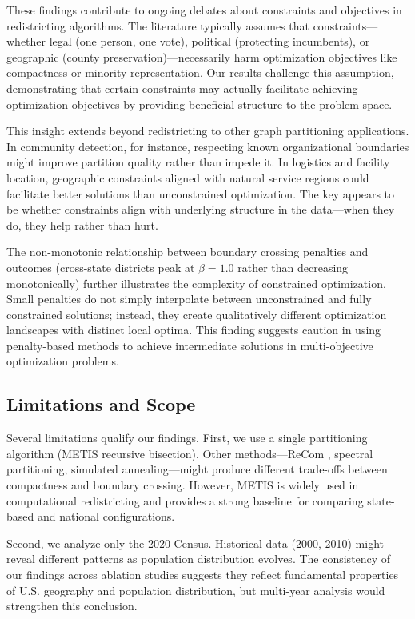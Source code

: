 These findings contribute to ongoing debates about constraints and objectives in redistricting algorithms. The literature typically assumes that constraints---whether legal (one person, one vote), political (protecting incumbents), or geographic (county preservation)---necessarily harm optimization objectives like compactness or minority representation. Our results challenge this assumption, demonstrating that certain constraints may actually facilitate achieving optimization objectives by providing beneficial structure to the problem space.

This insight extends beyond redistricting to other graph partitioning applications. In community detection, for instance, respecting known organizational boundaries might improve partition quality rather than impede it. In logistics and facility location, geographic constraints aligned with natural service regions could facilitate better solutions than unconstrained optimization. The key appears to be whether constraints align with underlying structure in the data---when they do, they help rather than hurt.

The non-monotonic relationship between boundary crossing penalties and outcomes (cross-state districts peak at $ \beta = 1.0 $ rather than decreasing monotonically) further illustrates the complexity of constrained optimization. Small penalties do not simply interpolate between unconstrained and fully constrained solutions; instead, they create qualitatively different optimization landscapes with distinct local optima. This finding suggests caution in using penalty-based methods to achieve intermediate solutions in multi-objective optimization problems.

\subsection{Limitations and Scope}

Several limitations qualify our findings. First, we use a single partitioning algorithm (METIS recursive bisection). Other methods---ReCom \citep{deford2019recombination}, spectral partitioning, simulated annealing---might produce different trade-offs between compactness and boundary crossing. However, METIS is widely used in computational redistricting and provides a strong baseline for comparing state-based and national configurations.

Second, we analyze only the 2020 Census. Historical data (2000, 2010) might reveal different patterns as population distribution evolves. The consistency of our findings across ablation studies suggests they reflect fundamental properties of U.S. geography and population distribution, but multi-year analysis would strengthen this conclusion.

